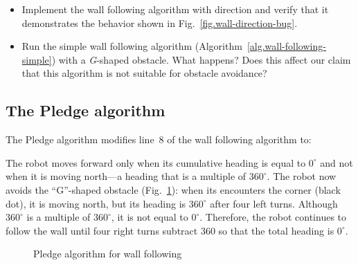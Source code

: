 \begin{framed}
\begin{itemize}
\item Implement the wall following algorithm with direction and verify that it demonstrates the behavior shown in Fig.~\ref{fig.wall-direction-bug}.
\item Run the simple wall following algorithm (Algorithm~\ref{alg.wall-following-simple}) with a \emph{G}-shaped obstacle. What happens? Does this affect our claim that this algorithm is not suitable for obstacle avoidance?
\end{itemize}
\end{framed}

\subsection{The Pledge algorithm}

The Pledge algorithm modifies line~8 of the wall following algorithm to:
\begin{quote}
\normalsize {}
\end{quote}
The robot moves forward only when its cumulative heading is equal to $0^\circ$ and not when it is moving north---a heading that is a multiple of $360^\circ$. The robot now avoids the ``G''-shaped obstacle (Fig.~\ref{fig.wall-following-pledge}): when its encounters the corner (black dot), it is moving north, but its heading is $360^\circ$ after four left turns. Although $360^\circ$ is a multiple of $360^\circ$, it is not equal to $0^\circ$. Therefore, the robot continues to follow the wall until four right turns subtract $360$ so that the total heading is $0^\circ$.

\begin{figure}
\begin{center}
\caption{Pledge algorithm for wall following}\label{fig.wall-following-pledge}
\end{center}
\end{figure}

